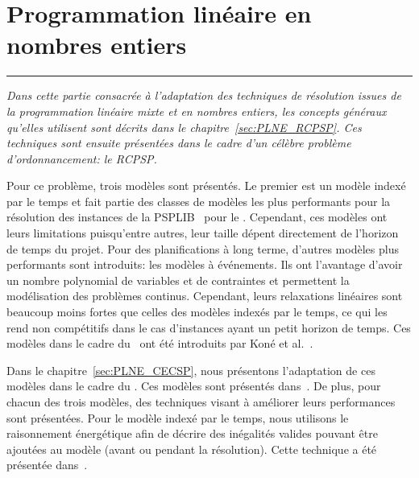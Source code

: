

\cleardoublepage
\begin{minipage}{0.95\linewidth}
\part{Programmation linéaire en nombres entiers}
\label{part:PLNE}
\vspace{15mm} %
\parttoc 
\end{minipage}
\newpage
\thispagestyle{empty}
\begin{center}
  \begin{minipage}{\textwidth}
    \hrule
    \vspace{0.5cm}
    {\it Dans cette partie consacrée à l'adaptation des techniques de
      résolution issues de la programmation linéaire mixte et en
      nombres entiers, les concepts généraux qu'elles utilisent sont
      décrits dans le chapitre~\ref{sec:PLNE_RCPSP}. Ces techniques sont
      ensuite présentées dans le cadre d'un célèbre problème
      d'ordonnancement: le RCPSP. 

      Pour ce problème, trois modèles sont présentés. Le premier est
      un modèle indexé par le temps et fait partie des classes de modèles
      les plus performants pour la résolution des instances de la
      PSPLIB~\cite{PSPLIB} pour le \RCPSP. Cependant, ces modèles ont leurs
      limitations puisqu'entre autres, leur taille dépent directement de
      l'horizon de temps du projet. Pour des planifications à long terme,
      d'autres modèles plus performants sont introduits: les modèles à
      événements. Ils ont l'avantage d'avoir un nombre polynomial de
      variables et de contraintes et permettent la modélisation des
      problèmes continus. Cependant, leurs relaxations linéaires sont
      beaucoup moins fortes que celles des modèles indexés par le temps,
      ce qui les rend non compétitifs dans le cas d'instances ayant un
      petit horizon de temps. Ces modèles dans le cadre du \RCPSP~ont été
      introduits par Koné et al.~\cite{modele_RCPSP}.

      Dans le chapitre~\ref{sec:PLNE_CECSP}, nous présentons
      l'adaptation de ces modèles dans le cadre du \CECSP. Ces modèles
      sont présentés
      dans~\cite{Nattaf_Constraints,Nattaf_ORSpectrum,Nattaf_CPDP}. De plus,
      pour chacun des trois modèles, des techniques visant à améliorer leurs
      performances sont présentées. Pour le modèle indexé par le
      temps, nous utilisons le raisonnement énergétique afin de
      décrire des inégalités valides pouvant être ajoutées au modèle
      (avant ou pendant la résolution). Cette technique a été
      présentée dans~\cite{Nattaf_JFPC}.

}
\end{minipage}
\end{center}
